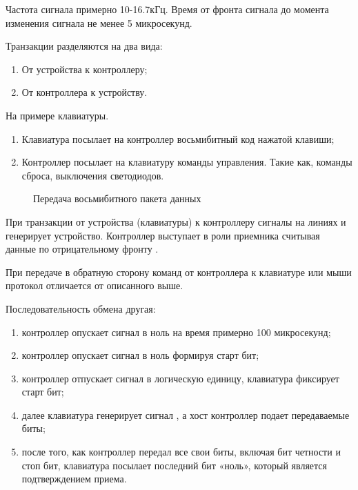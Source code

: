 \par{Частота сигнала  примерно 10-16.7кГц. Время от фронта сигнала  до момента изменения сигнала  не менее 5 микросекунд.}

\vspace{4mm}

\par{Транзакции разделяются на два вида:}
  \begin{enumerate}[noitemsep,topsep=0pt, after=\vspace{2pt}]
    \item От устройства к контроллеру;
    \item От контроллера к устройству.
  \end{enumerate}

\par{На примере клавиатуры.}
  \begin{enumerate}[noitemsep,topsep=0pt, after=\vspace{2pt}]
    \item Клавиатура посылает на контроллер восьмибитный код нажатой клавиши;
    \item Контроллер посылает на клавиатуру команды управления. Такие как, команды сброса, выключения светодиодов.
  \end{enumerate}

\begin{figure}[H]
	\centering
	\def\svgwidth{\columnwidth}
	
	\caption{Передача восьмибитного пакета данных}
\end{figure}

\par{При транзакции от устройства (клавиатуры) к контроллеру сигналы на линиях  и  генерирует устройство. Контроллер выступает в роли приемника считывая данные по отрицательному фронту .}

\par{При передаче в обратную сторону команд от контроллера к клавиатуре или мыши протокол отличается от описанного выше.}

\par{Последовательность обмена другая:}
  \begin{enumerate}[noitemsep,topsep=0pt, after=\vspace{2pt}]
    \item контроллер опускает сигнал  в ноль на время примерно 100 микросекунд;
    \item контроллер опускает сигнал  в ноль формируя старт бит;
    \item контроллер отпускает сигнал  в логическую единицу, клавиатура фиксирует старт бит;
    \item далее клавиатура генерирует сигнал , а хост контроллер подает передаваемые биты;
    \item после того, как контроллер передал все свои биты, включая бит четности и стоп бит, клавиатура посылает последний бит «ноль», который является подтверждением приема.
  \end{enumerate}


